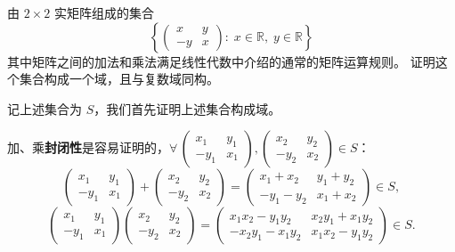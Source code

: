 \newcommand{\ee}{\mathrm{e}}
\newcommand{\ii}{\mathrm{i}}


\begin{question}
由 \(2\times 2\) 实矩阵组成的集合
\[
\left\{\begin{pmatrix} x & y \\ -y & x \end{pmatrix}:\; x\in\mathbb{R},\; y\in\mathbb{R}\right\}
\]
其中矩阵之间的加法和乘法满足线性代数中介绍的通常的矩阵运算规则。
证明这个集合构成一个域，且与复数域同构。
\begin{solution}
记上述集合为 \(S\)，我们首先证明上述集合构成域。

加、乘\textbf{封闭性}是容易证明的，\(\forall\,
\begin{pmatrix} x_1 & y_1 \\ -y_1 & x_1 \end{pmatrix},
\begin{pmatrix} x_2 & y_2 \\ -y_2 & x_2 \end{pmatrix}\in S\)：
\[
\begin{pmatrix} x_1 & y_1 \\ -y_1 & x_1 \end{pmatrix}
+\begin{pmatrix} x_2 & y_2 \\ -y_2 & x_2 \end{pmatrix}
=\begin{pmatrix} x_1+x_2 & y_1+y_2 \\ -y_1-y_2 & x_1+x_2 \end{pmatrix}\in S,
\]
\[
\begin{pmatrix} x_1 & y_1 \\ -y_1 & x_1 \end{pmatrix}
\begin{pmatrix} x_2 & y_2 \\ -y_2 & x_2 \end{pmatrix}
=\begin{pmatrix} x_1x_2-y_1y_2 & x_2y_1+x_1y_2 \\ -x_2y_1-x_1y_2 & x_1x_2-y_1y_2 \end{pmatrix}\in S.
\]


\end{solution}
\end{question}
